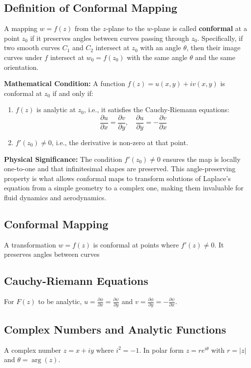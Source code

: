 \documentclass[12pt,a4paper]{article}
\begin{document}
\subsection{Definition of Conformal Mapping}
A mapping $w = f(z)$ from the $z$-plane to the $w$-plane is called \textbf{conformal} at a point $z_0$ if it preserves angles between curves passing through $z_0$. Specifically, if two smooth curves $C_1$ and $C_2$ intersect at $z_0$ with an angle $\theta$, then their image curves under $f$ intersect at $w_0 = f(z_0)$ with the same angle $\theta$ and the same orientation.

\textbf{Mathematical Condition:} A function $f(z) = u(x,y) + iv(x,y)$ is conformal at $z_0$ if and only if:
\begin{enumerate}
    \item $f(z)$ is analytic at $z_0$, i.e., it satisfies the Cauchy-Riemann equations:
    $$\frac{\partial u}{\partial x} = \frac{\partial v}{\partial y}, \quad \frac{\partial u}{\partial y} = -\frac{\partial v}{\partial x}$$
    \item $f'(z_0) \neq 0$, i.e., the derivative is non-zero at that point.
\end{enumerate}

\textbf{Physical Significance:} The condition $f'(z_0) \neq 0$ ensures the map is locally one-to-one and that infinitesimal shapes are preserved. This angle-preserving property is what allows conformal maps to transform solutions of Laplace's equation from a simple geometry to a complex one, making them invaluable for fluid dynamics and aerodynamics.
\subsection{Conformal Mapping}
A transformation $w = f(z)$ is conformal at points where $f'(z) \neq 0$. It preserves angles between curves
\subsection{Cauchy-Riemann Equations}
For $F(z)$ to be analytic, $u = \frac{\partial \phi}{\partial x} = \frac{\partial \psi}{\partial y}$ and $v = \frac{\partial \phi}{\partial y} = -\frac{\partial \psi}{\partial x}$.
\subsection{Complex Numbers and Analytic Functions}
A complex number $z = x + iy$ where $i^2 = -1$. In polar form $z = re^{i\theta}$ with $r = |z|$ and $\theta = \arg(z)$.
\end{document}
